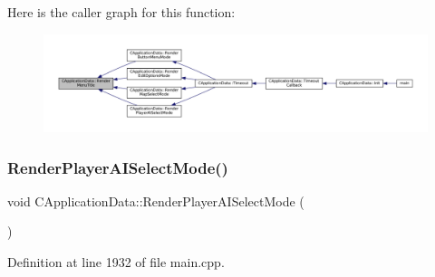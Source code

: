 Here is the caller graph for this function\+:\nopagebreak
\begin{figure}[H]
\begin{center}
\leavevmode
\includegraphics[width=350pt]{classCApplicationData_a548c5924a281c7e226fd7cac44e59920_icgraph}
\end{center}
\end{figure}
\hypertarget{classCApplicationData_a7d46646402ac95a056456e4a3bb353ed}{}\label{classCApplicationData_a7d46646402ac95a056456e4a3bb353ed} 
\subsubsection{\texorpdfstring{Render\+Player\+A\+I\+Select\+Mode()}{RenderPlayerAISelectMode()}}
{\footnotesize\ttfamily void C\+Application\+Data\+::\+Render\+Player\+A\+I\+Select\+Mode (\begin{DoxyParamCaption}{ }\end{DoxyParamCaption})\hspace{0.3cm}{\ttfamily [protected]}}



Definition at line 1932 of file main.\+cpp.


